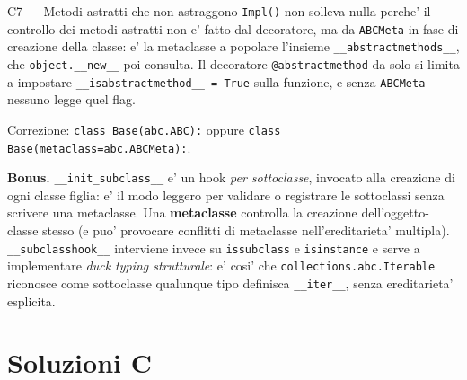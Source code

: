 \documentclass{report}
\newcommand{\code}[1]{\texttt{\small #1}}
\newcommand{\dunder}[1]{\texttt{\small \_\_#1\_\_}}
\begin{document}
\begin{soluzione}{C7 --- Metodi astratti che non astraggono}
\label{sol:C7}
\code{Impl()} non solleva nulla perche' il controllo dei metodi astratti non e'
fatto dal decoratore, ma da \code{ABCMeta} in fase di creazione della classe:
e' la metaclasse a popolare l'insieme \code{\_\_abstractmethods\_\_}, che
\code{object.\_\_new\_\_} poi consulta. Il decoratore \code{@abstractmethod} da
solo si limita a impostare \code{\_\_isabstractmethod\_\_ = True} sulla
funzione, e senza \code{ABCMeta} nessuno legge quel flag.

Correzione: \code{class Base(abc.ABC):} oppure
\code{class Base(metaclass=abc.ABCMeta):}.

\textbf{Bonus.} \dunder{init\_subclass} e' un hook \emph{per sottoclasse},
invocato alla creazione di ogni classe figlia: e' il modo leggero per
validare o registrare le sottoclassi senza scrivere una metaclasse. Una
\textbf{metaclasse} controlla la creazione dell'oggetto-classe stesso (e puo'
provocare conflitti di metaclasse nell'ereditarieta' multipla).
\code{\_\_subclasshook\_\_} interviene invece su \code{issubclass} e
\code{isinstance} e serve a implementare \emph{duck typing strutturale}: e' cosi'
che \code{collections.abc.Iterable} riconosce come sottoclasse qualunque tipo
definisca \dunder{iter}, senza ereditarieta' esplicita.
\end{soluzione}

\section{Soluzioni C}
\end{document}
